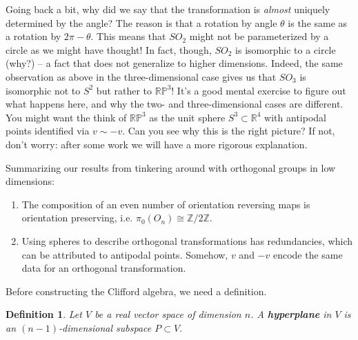 \documentclass{article}
\newcommand{\R}{\mathbb{R}}
\newcommand{\Z}{\mathbb{Z}}
\newcommand{\RP}{\mathbb{RP}}
\newtheorem{definition}{Definition}[subsection]
\begin{document}
Going back a bit, why did we say that the transformation is \emph{almost} uniquely determined by the angle? The reason is that a rotation by angle $\theta$ is the same as a rotation by $2\pi - \theta$. This means that $SO_2$ might not be parameterized by a circle as we might have thought! In fact, though, $SO_2$ is isomorphic to a circle (why?) -- a fact that does not generalize to higher dimensions. Indeed, the same observation as above in the three-dimensional case gives us that $SO_3$ is isomorphic not to $S^2$ but rather to $\RP^3$! It's a good mental exercise to figure out what happens here, and why the two- and three-dimensional cases are different. You might want the think of $\RP^3$ as the unit sphere $S^3 \subset \R^4$ with antipodal points identified via $v \sim -v$. Can you see why this is the right picture? If not, don't worry: after some work we will have a more rigorous explanation.

Summarizing our results from tinkering around with orthogonal groups in low dimensions:

\begin{enumerate}
\item The composition of an even number of orientation reversing maps is orientation preserving, i.e. $\pi_0(O_n) \cong \Z/2\Z$.
\item Using spheres to describe orthogonal transformations has redundancies, which can be attributed to antipodal points. Somehow, $v$ and $-v$ encode the same data for an orthogonal transformation.
\end{enumerate}

Before constructing the Clifford algebra, we need a definition.

\vspace{0.5em}

\begin{definition}
Let $V$ be a real vector space of dimension $n$. A \textbf{hyperplane} in $V$ is an $(n-1)$-dimensional subspace $P \subset V$.
\end{definition}

\vspace{0.5em}
\end{document}
